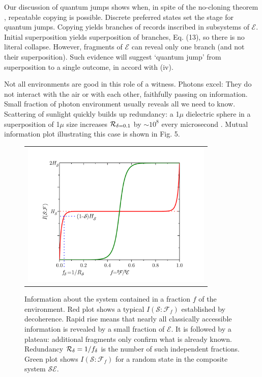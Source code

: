 \documentclass[aps,amsmath,amssymb,amsfonts,12pt]{revtex4-1}
\newcommand{\cS}        {{\mathcal S}}
\newcommand{\cE}        {{\mathcal E}}
\newcommand{\+}         {\dagger}
\newcommand\cF{{\mathcal F}}
\begin{document}
{{Our discussion of quantum jumps shows when, in spite of the no-cloning theorem \cite{65,24}, repeatable copying is possible. Discrete preferred states set the stage for quantum jumps.
Copying yields branches of records inscribed in subsystems of $\cE$. Initial superposition yields superposition of branches, Eq. (13), so there is no literal collapse.
However, fragments of $\cE$ can reveal only one branch (and not their superposition). Such evidence will suggest `quantum jump' from superposition to a single outcome, in accord with (iv).

Not all environments are good in this role of a witness. Photons excel: They do not interact with the air or with each other, faithfully passing on information. Small fraction of photon environment usually reveals all we need to know. Scattering of sunlight quickly builds up redundancy: a 1$\mu$ dielectric sphere in a superposition of 1$\mu$ size increases ${\cal R}_{\delta=0.1}$ by $ \sim 10^8$ every microsecond \cite{RiedelZ10, RiedelZ12}. Mutual information plot illustrating this case is shown in Fig. 5.

{\begin{figure}[tb]
\begin{tabular}{l}
\vspace{-0.15in} 
\includegraphics[width=3.6in]{MIPlot.pdf}\\
\end{tabular}
\caption{Information about the system contained in a fraction $f$ of the environment. Red plot shows a typical $I(\cS : \cF_f)$ established by decoherence. Rapid rise means that nearly all classically accessible information is revealed by a small fraction of $\cE$. It is followed by a plateau: additional fragments only confirm what is already known. Redundancy ${\cal R_\delta} = 1 / f_\delta$ is the number of such independent fractions. Green plot shows $I(\cS : \cF_f)$ for a random state in the composite system ${\cS\cE}$.
}
\label{RedPIP}
\end{figure}


}}}
\end{document}
